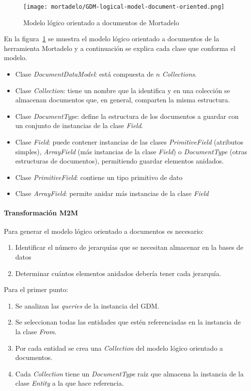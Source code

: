 \begin{figure}[h!t] 
    \centering
    \texttt{[image: mortadelo/GDM-logical-model-document-oriented.png]}
    \caption{Modelo lógico orientado a documentos de Mortadelo}
    \label{img:mortadelo-gdm-logical-model-document-oriented}
\end{figure}


En la figura~\ref{img:mortadelo-gdm-logical-model-document-oriented} se muestra el modelo lógico orientado a documentos de la herramienta Mortadelo y a continuación se explica cada clase que conforma el modelo.


\begin{itemize}
    \item Clase \textit{DocumentDataModel}: está compuesta de $n$ \textit{Collections}.
    \item Clase \textit{Collection}: tiene un nombre que la identifica y en una colección se almacenan documentos que, en general, comparten la misma estructura.
    \item Clase \textit{DocumentType}: define la estructura de los documentos a guardar con un conjunto de instancias de la clase \textit{Field}.
    \item Clase \textit{Field}: puede contener instancias de las clases \textit{PrimitiveField} (atributos simples), \textit{ArrayField} (más instancias de la clase \textit{Field}) o \textit{DocumentType} (otras estructuras de documentos), permitiendo guardar elementos anidados.
    \item Clase \textit{PrimitiveField}: contiene un tipo primitivo de dato
    \item Clase \textit{ArrayField}: permite anidar más instancias de la clase \textit{Field}
\end{itemize}

\paragraph*{Transformación M2M}
Para generar el modelo lógico orientado a documentos es necesario:
\begin{enumerate}
    \item Identificar el número de jerarquías que se necesitan almacenar en la bases de datos
    \item Determinar cuántos elementos anidados debería tener cada jerarquía.
\end{enumerate}

Para el primer punto:
\begin{enumerate}
    \item Se analizan las \textit{queries} de la instancia del GDM.
    \item Se seleccionan todas las entidades que estén referenciadas en la instancia de la clase \textit{From}.
    \item Por cada entidad se crea una \textit{Collection} del modelo lógico orientado a documentos.
    \item Cada \textit{Collection} tiene un \textit{DocumentType} raíz que almacena la instancia de la clase \textit{Entity} a la que hace referencia.
\end{enumerate}


